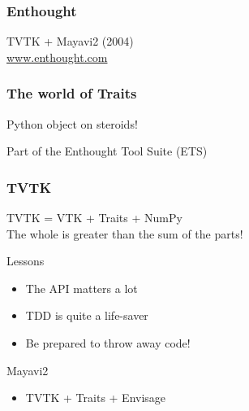 \begin{frame}[plain]
    \Large
    \begin{center}
        \vspace*{3in}
        {}
    \end{center}
\end{frame}

\begin{frame}
    \frametitle{Enthought}
    \Large
    \begin{center}
        TVTK + Mayavi2 (2004)\\
        \vspace*{1in}
    \large
    \url{www.enthought.com}
    \end{center}
\end{frame}

\begin{frame}
    \frametitle{The world of Traits}
    \Large
    \begin{center}
        Python object on steroids!

        \vspace*{1in}
        Part of the Enthought Tool Suite (ETS)
    \end{center}
\end{frame}

\begin{frame}
    \frametitle{TVTK}
    \Large
    \begin{center}
        TVTK = VTK + Traits + NumPy\\
        \vspace*{1in}
        The whole is greater than the sum of the parts!
    \end{center}
\end{frame}

\begin{frame}{Lessons}
    \Large
    \begin{itemize}
        \item The API matters a lot
        \item TDD is quite a life-saver
        \item Be prepared to throw away code!
    \end{itemize}
\end{frame}

\begin{frame}{Mayavi2}
  \Large
  \begin{itemize}
  \item  TVTK + Traits + Envisage
  \end{itemize}
\end{frame}


